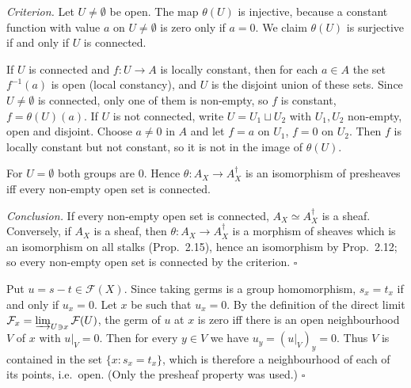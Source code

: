 \documentclass[11pt]{article}
\begin{document}
\emph{Criterion.} Let $U\neq\emptyset$ be open. The map $\theta(U)$ is injective, because a constant function with value $a$ on $U\ne\emptyset$ is zero only if $a=0$. We claim $\theta(U)$ is surjective if and only if $U$ is connected.

If $U$ is connected and $f:U\to A$ is locally constant, then for each $a\in A$ the set $f^{-1}(a)$ is open (local constancy), and $U$ is the disjoint union of these sets. Since $U\neq\emptyset$ is connected, only one of them is non-empty, so $f$ is constant, $f=\theta(U)(a)$. If $U$ is not connected, write $U=U_1\sqcup U_2$ with $U_1,U_2$ non-empty, open and disjoint. Choose $a\neq0$ in $A$ and let $f=a$ on $U_1$, $f=0$ on $U_2$. Then $f$ is locally constant but not constant, so it is not in the image of $\theta(U)$.

For $U=\emptyset$ both groups are $0$. Hence $\theta:A_X\to A_X^\dagger$ is an isomorphism of presheaves iff every non-empty open set is connected.

\emph{Conclusion.} If every non-empty open set is connected, $A_X\simeq A_X^\dagger$ is a sheaf. Conversely, if $A_X$ is a sheaf, then $\theta:A_X\to A_X^\dagger$ is a morphism of sheaves which is an isomorphism on all stalks (Prop.~2.15), hence an isomorphism by Prop.~2.12; so every non-empty open set is connected by the criterion. \hfill$\square$

\pf
Put $u=s-t\in\mathcal F(X)$. Since taking germs is a group homomorphism, $s_x=t_x$ if and only if $u_x=0$. Let $x$ be such that $u_x=0$. By the definition of the direct limit $\mathcal F_x=\varinjlim_{U\ni x}\mathcal F(U)$, the germ of $u$ at $x$ is zero iff there is an open neighbourhood $V$ of $x$ with $u|_V=0$. Then for every $y\in V$ we have $u_y=(u|_V)_y=0$. Thus $V$ is contained in the set $\{x: s_x=t_x\}$, which is therefore a neighbourhood of each of its points, i.e.\ open. (Only the presheaf property was used.) \hfill$\square$
\end{document}
